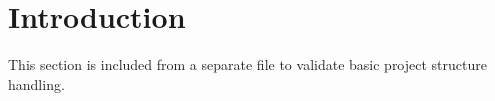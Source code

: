 \section{Introduction}

This section is included from a separate file to validate basic project structure handling.
